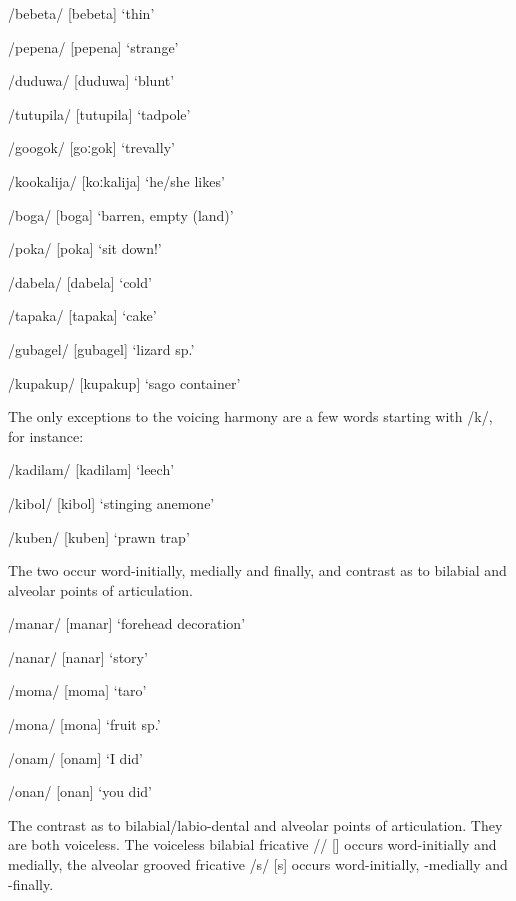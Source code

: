/bebeta/  [be{{\textprimstress}beta}]  `thin'

/pepena/  [pe{{\textprimstress}pena}]  `strange'

/duduwa/  [du{{\textprimstress}duwa}]  `blunt'

/tutupila/  [tu{{\textprimstress}tupila}]  `tadpole'

/googok/  [{{\textprimstress}goːgok}]  `trevally'

/kookalija/  [{{\textprimstress}koːkalija}]  `he/she likes'

/boga/  [bo{{\textprimstress}ga}]  `barren, empty (land)'

/poka/  [po{{\textprimstress}ka}]  `sit down!'

/dabela/  [da{{\textprimstress}bela}]  `cold'

/tapaka/  [ta{{\textprimstress}paka}]  `cake'

/gubagel/  [gu{{\textprimstress}bagel}]  `lizard sp.' 

/kupakup/  [ku{{\textprimstress}pakup}]  `sago container'

The only exceptions to the voicing harmony are a few words starting with /k/, for instance:

/kadilam/  [ka{{\textprimstress}dilam}]  `leech'

/kibol/  [ki{{\textprimstress}bol}]  `stinging anemone'

/kuben/  [ku{{\textprimstress}ben}]  `prawn trap'

The two  occur word-initially, medially and finally, and contrast as to bilabial and alveolar points of articulation. 

/manar/  [ma{{\textprimstress}nar}]  `forehead decoration'

/nanar/  [na{{\textprimstress}nar}]  `story'

/moma/  [mo{{\textprimstress}ma}]  `taro'

/mona/  [mo{{\textprimstress}na}]  `fruit sp.'

/onam/  [o{{\textprimstress}nam}]  `I did'

/onan/  [o{{\textprimstress}nan}]  `you did'

The  contrast as to bilabial/labio-dental and alveolar points of articulation. They are both voiceless. The voiceless bilabial fricative /{\textphi}/ [{\textphi}] occurs word-initially and medially, the alveolar grooved fricative /s/ [s] occurs word-initially, -medially and \nobreakdash-finally. 

